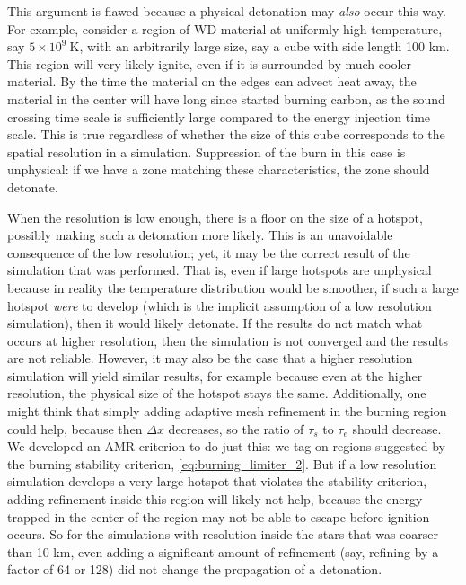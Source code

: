 \documentclass[twocolumn,numberedappendix]{../aastex62}
\begin{document}
This argument is flawed because a physical detonation may \textit{also}
occur this way. For example, consider a region of WD material at uniformly
high temperature, say $5 \times 10^9\ \text{K}$, with an arbitrarily large size,
say a cube with side length 100 km. This region will very likely ignite,
even if it is surrounded by much cooler material. By the time the material on
the edges can advect heat away, the material in the center will have long since
started burning carbon, as the sound crossing time scale is sufficiently large
compared to the energy injection time scale. This is true regardless of whether
the size of this cube corresponds to the spatial resolution in a simulation.
Suppression of the burn in this case is unphysical: if we have a zone matching
these characteristics, the zone should detonate.

When the resolution is low enough, there is a floor on the size of a hotspot,
possibly making such a detonation more likely. This is an unavoidable consequence
of the low resolution; yet, it may be the correct result of the simulation that
was performed. That is, even if large hotspots are unphysical because in reality
the temperature distribution would be smoother, if such a large hotspot \textit{were}
to develop (which is the implicit assumption of a low resolution simulation), then
it would likely detonate. If the results do not match what occurs at higher
resolution, then the simulation is not converged and the results are not reliable.
However, it may also be the case that a higher resolution simulation will yield
similar results, for example because even at the higher resolution, the physical
size of the hotspot stays the same. Additionally, one might think that simply
adding adaptive mesh refinement in the burning region could help, because then
$\Delta x$ decreases, so the ratio of $\tau_s$ to $\tau_e$ should decrease.
We developed an AMR criterion to do just this: we tag on regions suggested by
the burning stability criterion, \autoref{eq:burning_limiter_2}. But if a low
resolution simulation develops a very large hotspot that violates the stability
criterion, adding refinement inside this region will likely not help, because the
energy trapped in the center of the region may not be able to escape before ignition
occurs. So for the simulations with resolution inside the stars that was coarser than
10 km, even adding a significant amount of refinement (say, refining by a factor of
64 or 128) did not change the propagation of a detonation.
\end{document}
